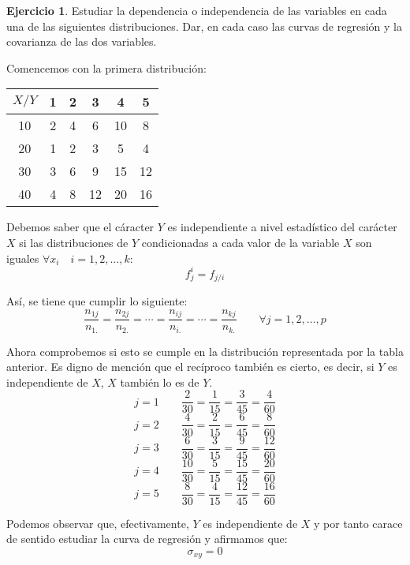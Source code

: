 \documentclass[a4paper, 12pt]{article}
\theoremstyle{definition}
\newtheorem{ej}{Ejercicio}
\begin{document}
\begin{ej}
Estudiar la dependencia o independencia de las variables en cada una de las siguientes distribuciones. Dar, en cada caso las curvas de regresión y la covarianza de las dos variables. \\

\par

Comencemos con la primera distribución:

\begin{center}
\begin{tabular}{c|ccccc}
	\(X/Y\) & 1 & 2 & 3 & 4 & 5 \\
	\hline
	10 & 2 & 4 & 6 & 10 & 8 \\
	20 & 1 & 2 & 3 & 5 & 4 \\
	30 & 3 & 6 & 9 & 15 & 12 \\
	40 & 4 & 8 & 12 & 20 & 16
\end{tabular}
\end{center}

Debemos saber que el cáracter \(Y\) es independiente a nivel estadístico del carácter \(X\) si las distribuciones de \(Y\) condicionadas a cada valor de la variable \(X\) son iguales \(\forall x_i \quad i = 1, 2, \dotsc, k\):
\[
	f_j^i = f_{j/i}
\]

Así, se tiene que cumplir lo siguiente:
\begin{equation} \label{ref:independenciaXY}
	\frac{n_{1j}}{n_{1.}} = \frac{n_{2j}}{n_{2.}} = \dotsm = \frac{n_{ij}}{n_{i.}} = \dotsm = \frac{n_{kj}}{n_{k.}} \qquad \forall j = 1,2, \dotsc, p
\end{equation}

Ahora comprobemos si esto se cumple en la distribución representada por la tabla anterior. Es digno de mención que el recíproco también es cierto, es decir, si \(Y\) es independiente de \(X\), \(X\) también lo es de \(Y\).
\[
	j = 1 \qquad \frac{2}{30} = \frac{1}{15} = \frac{3}{45} = \frac{4}{60}
\]
\[
	j = 2 \qquad \frac{4}{30} = \frac{2}{15} = \frac{6}{45} = \frac{8}{60}
\]
\[
	j = 3 \qquad \frac{6}{30} = \frac{3}{15} = \frac{9}{45} = \frac{12}{60}
\]
\[
	j = 4 \qquad \frac{10}{30} = \frac{5}{15} = \frac{15}{45} = \frac{20}{60}
\]
\[
	j = 5 \qquad \frac{8}{30} = \frac{4}{15} = \frac{12}{45} = \frac{16}{60}
\]

Podemos observar que, efectivamente, \(Y\) es independiente de \(X\) y por tanto carace de sentido estudiar la curva de regresión y afirmamos que:
\[
	\sigma_{xy} = 0
\]

\par 


\end{ej}
\end{document}
